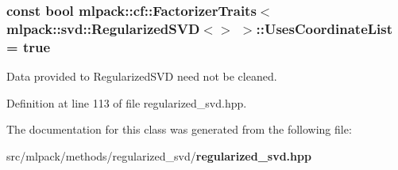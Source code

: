 \subsubsection[{Uses\+Coordinate\+List}]{\setlength{\rightskip}{0pt plus 5cm}const bool {\bf mlpack\+::cf\+::\+Factorizer\+Traits}$<$ {\bf mlpack\+::svd\+::\+Regularized\+S\+VD}$<$$>$ $>$\+::Uses\+Coordinate\+List = true\hspace{0.3cm}{\ttfamily [static]}}\label{classmlpack_1_1cf_1_1FactorizerTraits_3_01mlpack_1_1svd_1_1RegularizedSVD_3_4_01_4_a411173411fda1dc5f60861ea42aa1cf9}


Data provided to Regularized\+S\+VD need not be cleaned. 



Definition at line 113 of file regularized\+\_\+svd.\+hpp.



The documentation for this class was generated from the following file\+:\begin{DoxyCompactItemize}
\item 
src/mlpack/methods/regularized\+\_\+svd/{\bf regularized\+\_\+svd.\+hpp}\end{DoxyCompactItemize}
